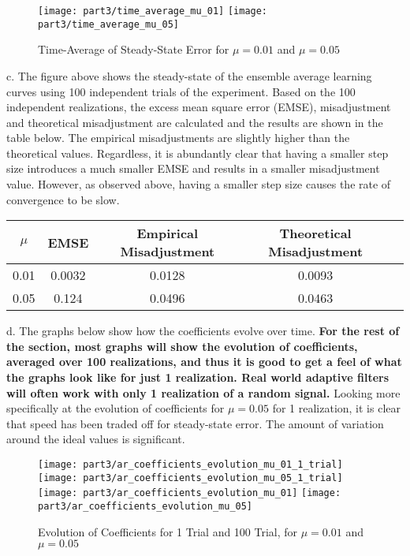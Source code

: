 \begin{figure}[H]
\centering{}
\texttt{[image: part3/time\_average\_mu\_01]}
\texttt{[image: part3/time\_average\_mu\_05]}
\caption{Time-Average of Steady-State Error for $\mu=0.01$ and $\mu=0.05$}
\end{figure}

\noindent{}c. The figure above shows the steady-state of the ensemble average learning curves using 100 independent trials of the experiment. Based on the 100 independent realizations, the excess mean square error (EMSE), misadjustment and theoretical misadjustment are calculated and the results are shown in the table below. The empirical misadjustments are slightly higher than the theoretical values. Regardless, it is abundantly clear that having a smaller step size introduces a much smaller EMSE and results in a smaller misadjustment value. However, as observed above, having a smaller step size causes the rate of convergence to be slow.  

\begin{table}[H]
\centering
\begin{tabular}{|c|c|c|c|c|}
\hline
$\mu$& EMSE   & Empirical Misadjustment 	& Theoretical Misadjustment		\\ \hline
0.01 & 0.0032 & 0.0128                 	& 0.0093                   		\\ \hline
0.05 & 0.124  & 0.0496                 	& 0.0463                  		\\ \hline
\end{tabular}
\end{table}

\noindent{}d. The graphs below show how the coefficients evolve over time. \textbf{For the rest of the section, most graphs will show the evolution of coefficients, averaged over 100 realizations, and thus it is good to get a feel of what the graphs look like for just 1 realization. Real world adaptive filters will often work with only 1 realization of a random signal.} Looking more specifically at the evolution of coefficients for $\mu=0.05$ for 1 realization, it is clear that speed has been traded off for steady-state error. The amount of variation around the ideal values is significant.

\begin{figure}[H]
\centering{}
\texttt{[image: part3/ar\_coefficients\_evolution\_mu\_01\_1\_trial]}
\texttt{[image: part3/ar\_coefficients\_evolution\_mu\_05\_1\_trial]} \\ 
\texttt{[image: part3/ar\_coefficients\_evolution\_mu\_01]}
\texttt{[image: part3/ar\_coefficients\_evolution\_mu\_05]}
\caption{Evolution of Coefficients for 1 Trial and 100 Trial, for $\mu=0.01$ and $\mu=0.05$}
\label{fig:steady_state_convergence}
\end{figure}

